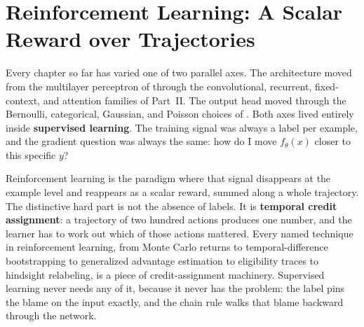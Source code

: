 
\chapter[Reinforcement Learning]{Reinforcement Learning: A Scalar Reward
over Trajectories}%
\label{ch:rl}

Every chapter so far has varied one of two parallel axes. The architecture
moved from the multilayer perceptron of  through the
convolutional, recurrent, fixed-context, and attention families of Part~II.
The output head moved through the Bernoulli, categorical, Gaussian, and
Poisson choices of . Both axes lived entirely inside
\textbf{supervised learning}. The training signal was always a label per
example, and the gradient question was always the same: how do I move
$f_\theta(x)$ closer to this specific $y$?

Reinforcement learning is the paradigm where that signal disappears at the
example level and reappears as a scalar reward, summed along a whole
trajectory. The distinctive hard part is not the absence of labels. It is
\textbf{temporal credit assignment}: a trajectory of two hundred actions
produces one number, and the learner has to work out which of those actions
mattered. Every named technique in reinforcement learning, from Monte Carlo
returns to temporal-difference bootstrapping to generalized advantage
estimation to eligibility traces to hindsight relabeling, is a piece of
credit-assignment machinery. Supervised learning never needs any of it,
because it never has the problem: the label pins the blame on the input
exactly, and the chain rule walks that blame backward through the network.

